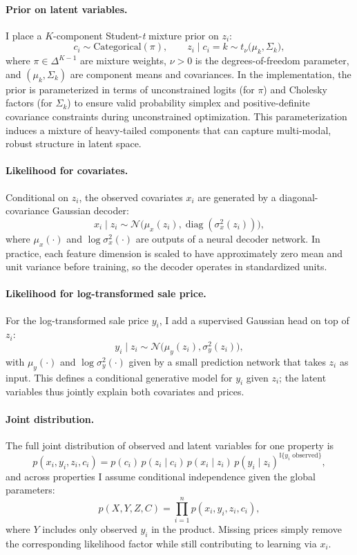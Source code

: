 \documentclass[11pt]{article}
\begin{document}
\paragraph{Prior on latent variables.} I place a $K$-component Student-\emph{t} mixture prior on $z_i$:
\[
c_i \sim \text{Categorical}(\pi), \qquad
z_i \mid c_i = k \sim t_\nu\big(\mu_k, \Sigma_k\big),
\]
where $\pi \in \Delta^{K-1}$ are mixture weights, $\nu > 0$ is the degrees-of-freedom parameter, and $(\mu_k,\Sigma_k)$ are component means and covariances. In the implementation, the prior is parameterized in terms of unconstrained logits (for $\pi$) and Cholesky factors (for $\Sigma_k$) to ensure valid probability simplex and positive-definite covariance constraints during unconstrained optimization. This parameterization induces a mixture of heavy-tailed components that can capture multi-modal, robust structure in latent space.

\paragraph{Likelihood for covariates.} Conditional on $z_i$, the observed covariates $x_i$ are generated by a diagonal-covariance Gaussian decoder:
\[
x_i \mid z_i \sim \mathcal{N}\big(\mu_x(z_i), \operatorname{diag}(\sigma^2_x(z_i))\big),
\]
where $\mu_x(\cdot)$ and $\log \sigma_x^2(\cdot)$ are outputs of a neural decoder network. In practice, each feature dimension is scaled to have approximately zero mean and unit variance before training, so the decoder operates in standardized units.

\paragraph{Likelihood for log-transformed sale price.} For the log-transformed sale price $y_i$, I add a supervised Gaussian head on top of $z_i$:
\[
y_i \mid z_i \sim \mathcal{N}\big(\mu_y(z_i), \sigma_y^2(z_i)\big),
\]
with $\mu_y(\cdot)$ and $\log \sigma_y^2(\cdot)$ given by a small prediction network that takes $z_i$ as input. This defines a conditional generative model for $y_i$ given $z_i$; the latent variables thus jointly explain both covariates and prices.

\paragraph{Joint distribution.} The full joint distribution of observed and latent variables for one property is
\[
p(x_i, y_i, z_i, c_i)
= p(c_i)\, p(z_i \mid c_i)\, p(x_i \mid z_i)\, p(y_i \mid z_i)^{\mathbb{I}\{y_i \text{ observed}\}},
\]
and across properties I assume conditional independence given the global parameters:
\[
p(X, Y, Z, C)
= \prod_{i=1}^n p(x_i, y_i, z_i, c_i),
\]
where $Y$ includes only observed $y_i$ in the product. Missing prices simply remove the corresponding likelihood factor while still contributing to learning via $x_i$.
\end{document}
